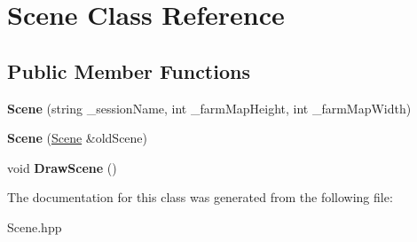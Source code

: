 \hypertarget{class_scene}{}\section{Scene Class Reference}
\label{class_scene}
\subsection*{Public Member Functions}
\begin{DoxyCompactItemize}
\item 
\mbox{\label{class_scene_a1d70584e5f6fabcbfe0208eb31f37a4f}} 
{\bfseries Scene} (string \+\_\+session\+Name, int \+\_\+farm\+Map\+Height, int \+\_\+farm\+Map\+Width)
\item 
\mbox{\label{class_scene_a1d7356a93de9321eae314ea9589633f1}} 
{\bfseries Scene} (\mbox{\hyperlink{class_scene}{Scene}} \&old\+Scene)
\item 
\mbox{\label{class_scene_aa1cf159cbc4a44528466c7b53ccd48f0}} 
void {\bfseries Draw\+Scene} ()
\end{DoxyCompactItemize}


The documentation for this class was generated from the following file\+:\begin{DoxyCompactItemize}
\item 
Scene.\+hpp\end{DoxyCompactItemize}
